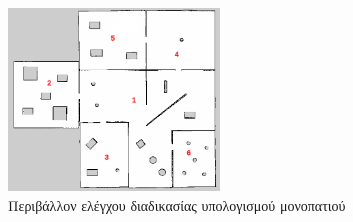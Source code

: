 \begin{figure}
    \centering
    \includegraphics[width=0.5\textwidth]{./images/chapter5/wf_opt_ogm.png}
    \caption{Περιβάλλον ελέγχου διαδικασίας υπολογισμού μονοπατιού}
    \label{fig:wf_opt_ogm}
\end{figure}



